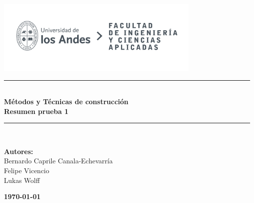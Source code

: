 \documentclass{article} %
\begin{document}
\begin{titlepage}%
\newcommand{\HRule}{\rule{\linewidth}{0.5mm}} 
\center 
\includegraphics[width=10cm]{LOGO_UNIVERSIDAD.jpg}\\ %
\vspace{3cm}
\HRule \\[0.4cm]
{ \huge \bfseries Métodos y Técnicas de construcción}\\[0.4cm] %
{ \huge \bfseries Resumen prueba 1}\\[0.4cm] %
\HRule \\[1.5cm]
 \vspace{5cm}
\begin{flushright}
    { \textbf{Autores:}\\
    Bernardo Caprile Canala-Echevarría\\
    Felipe Vicencio\\
    Lukas Wolff\\
    }
\end{flushright}
\vspace{1cm}
{\large \textbf{\today}}\\[2cm] %
\end{titlepage}
\end{document}
